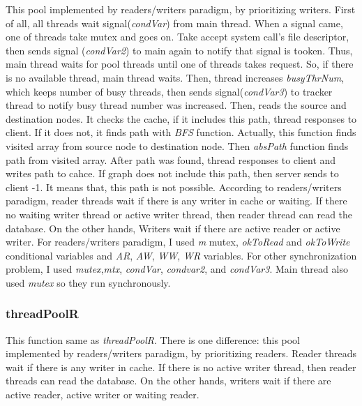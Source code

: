 \documentclass[twoside,11pt]{article}
\begin{document}
This pool implemented by readers/writers paradigm, by prioritizing writers. First of all, all threads wait signal(\emph{condVar}) from main thread. When a signal came, one of threads take mutex and goes on. Take accept system call's file descriptor, then sends signal (\emph{condVar2}) to main again to notify that signal is tooken. Thus, main thread waits for pool threads until one of threads takes request. So, if there is no available thread, main thread waits. Then, thread increases \emph{busyThrNum}, which keeps number of busy threads, then sends signal(\emph{condVar3}) to tracker thread to notify busy thread number was increased. Then, reads the source and destination nodes. It checks the cache, if it includes this path, thread responses to client. If it does not, it finds path with \emph{BFS} function. Actually, this function finds visited array from source node to destination node. Then \emph{absPath} function finds path from visited array. After path was found, thread responses to client and writes path to cahce. If graph does not include this path, then server sends to client -1. It means that, this path is not possible.\newline
\newline
According to readers/writers paradigm, reader threads wait if there is any writer in cache or waiting. If there no waiting writer thread or active writer thread, then reader thread can read the database. On the other hands, Writers wait if there are active reader or active writer. For readers/writers paradigm, I used \emph{m} mutex, \emph{okToRead} and \emph{okToWrite} conditional variables and \emph{AR}, \emph{AW}, \emph{WW}, \emph{WR} variables.\newline
\newline
For other synchronization problem, I used \emph{mutex},\emph{mtx}, \emph{condVar}, \emph{condvar2}, and \emph{condVar3}. Main thread also used \emph{mutex} so they run synchronously.

\subsubsection{threadPoolR}

This function same as \emph{threadPoolR}. There is one difference: this pool implemented by readers/writers paradigm, by prioritizing readers. Reader threads wait if there is any writer in cache. If there is no active writer thread, then reader threads can read the database. On the other hands, writers wait if there are active reader, active writer or waiting reader.
\end{document}
